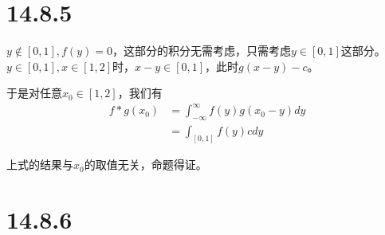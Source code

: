 \documentclass{article}
\begin{document}
\section*{14.8.5}

$y \notin [0, 1], f(y) = 0$，这部分的积分无需考虑，只需考虑$y \in [0, 1]$这部分。
$y \in [0, 1], x \in [1, 2]$时，$x - y \in [0, 1]$，此时$g(x - y) - c$。

于是对任意$x_0 \in [1, 2]$，我们有
\begin{align*}
  f \ast g(x_0) & = \int_{-\infty}^{\infty} f(y)g(x_0 - y) dy \\
                & = \int_{[0, 1]} f(y) c dy
\end{align*}

上式的结果与$x_0$的取值无关，命题得证。

\section*{14.8.6}
\end{document}
